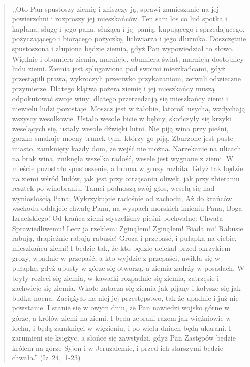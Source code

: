 \documentclass[10pt,a4paper,oneside]{article}
\begin{document}
\paragraph{}
\begin{quote}
,,Oto Pan spustoszy ziemię i zniszczy ją, sprawi zamieszanie na jej powierzchni i rozproszy jej mieszkańców. Ten sam los co lud spotka i kapłana, sługę i jego pana, służącą i jej panią, kupującego i sprzedającego, pożyczającego i biorącego pożyczkę, lichwiarza i jego dłużnika. Doszczętnie spustoszona i złupiona będzie ziemia, gdyż Pan wypowiedział to słowo. Więdnie i obumiera ziemia, marnieje, obumiera świat, marnieją dostojnicy ludu ziemi. Ziemia jest splugawiona pod swoimi mieszkańcami, gdyż przestąpili prawa, wykroczyli przeciwko przykazaniom, zerwali odwieczne przymierze. Dlatego klątwa pożera ziemię i jej mieszkańcy muszą odpokutować swoje winy; dlatego przerzedzają się mieszkańcy ziemi i niewielu ludzi pozostaje. Moszcz jest w żałobie, latorośl usycha, wzdychają wszyscy wesołkowie. Ustało wesołe bicie w bębny, skończyły się krzyki weselących się, ustały wesołe dźwięki lutni. Nie piją wina przy pieśni, gorzko smakuje mocny trunek tym, którzy go piją. Zburzone jest puste miasto, zamknięty każdy dom, że wejść nie można. Narzekanie na ulicach na brak wina, zniknęła wszelka radość, wesele jest wygnane z ziemi. W mieście pozostało spustoszenie, a brama w gruzy rozbita. Gdyż tak będzie na ziemi wśród ludów, jak jest przy otrząsaniu oliwek, jak przy zbieraniu resztek po winobraniu. Tamci podnoszą swój głos, weselą się nad wyniosłością Pana; Wykrzykujcie radośnie od zachodu, Aż do krańców wschodu oddajcie chwałę Panu, na wyspach morskich imieniu Pana, Boga Izraelskiego! Od krańca ziemi słyszeliśmy pieśni pochwalne: Chwała Sprawiedliwemu! Lecz ja rzekłem: Zginąłem! Zginąłem! Biada mi! Rabusie rabują, drapieżnie rabują rabusie! Groza i przepaść, i pułapka na ciebie, mieszkańcu ziemi! I będzie tak, że kto będzie uciekał przed okrzykiem grozy, wpadnie w przepaść, a kto wyjdzie z przepaści, uwikła się w pułapkę, gdyż upusty w górze się otworzą, a ziemia zadrży w posadach. W bryły rozleci się ziemia, w kawałki rozpadnie się ziemia, zatrzęsie i zachwieje się ziemia. Wkoło zatacza się ziemia jak pijany i kołysze się jak budka nocna. Zaciążyło na niej jej przestępstwo, tak że upadnie i już nie powstanie. I stanie się w owym dniu, że Pan nawiedzi wojsko górne w górze, a królów ziemi na ziemi. I będą zebrani razem jak więźniowie w lochu, i będą zamknięci w więzieniu, i po wielu dniach będą ukarani. I zarumieni się księżyc, a słońce się zawstydzi, gdyż Pan Zastępów będzie królem na górze Syjon i w Jeruzalemie, i przed ich starszymi będzie chwała.'' \mbox{(Iz 24, 1-23)}
\end{quote}
\end{document}

